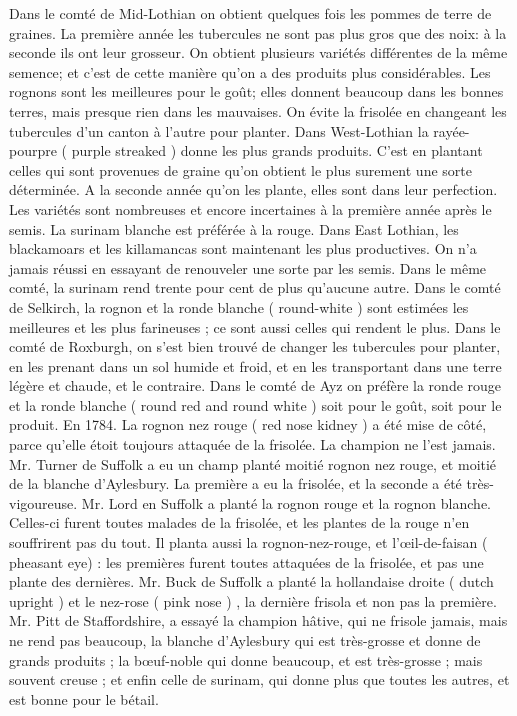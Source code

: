 Dans le comté de Mid-Lothian on obtient quelques fois les pommes de terre de graines. La première année les tubercules ne sont pas plus gros que des noix: à la seconde ils ont leur grosseur. On obtient plusieurs variétés différentes de la même semence; et c'est de cette manière qu'on a des produits plus considérables. Les rognons sont les meilleures pour le goût; elles donnent beaucoup dans les bonnes\setcounter{page}{261} terres, mais presque rien dans les mauvaises. On évite la frisolée en changeant les tubercules d'un canton à l'autre pour planter. Dans West-Lothian la rayée-pourpre ( purple streaked ) donne les plus grands produits. C'est en plantant celles qui sont provenues de graine qu'on obtient le plus surement une sorte déterminée. A la seconde année qu'on les plante, elles sont dans leur perfection. Les variétés sont nombreuses et encore incertaines à la première année après le semis. La surinam blanche est préférée à la rouge. Dans East Lothian, les blackamoars et les killamancas sont maintenant les plus productives. On n'a jamais réussi en essayant de renouveler une sorte par les semis. Dans le même comté, la surinam rend trente pour cent de plus qu'aucune autre. Dans le comté de Selkirch, la rognon et la ronde blanche ( round-white ) sont estimées les meilleures et les plus farineuses ; ce sont aussi celles qui rendent le plus. Dans le comté de Roxburgh, on s'est bien trouvé de changer les tubercules pour planter, en les prenant dans un sol humide et froid, et en les transportant dans une terre légère et chaude, et le contraire. Dans le comté de Ayz on préfère la ronde rouge et la ronde blanche ( round red and\setcounter{page}{262} round white ) soit pour le goût, soit pour le produit.
En 1784. La rognon nez rouge ( red nose kidney ) a été mise de côté, parce qu'elle étoit toujours attaquée de la frisolée. La champion ne l'est jamais.
Mr. Turner de Suffolk a eu un champ planté moitié rognon nez rouge, et moitié de la blanche d'Aylesbury. La première a eu la frisolée, et la seconde a été très-vigoureuse.
Mr. Lord en Suffolk a planté la rognon rouge et la rognon blanche. Celles-ci furent toutes malades de la frisolée, et les plantes de la rouge n'en souffrirent pas du tout. Il planta aussi la rognon-nez-rouge, et l'œil-de-faisan ( pheasant eye) : les premières furent toutes attaquées de la frisolée, et pas une plante des dernières.
Mr. Buck de Suffolk a planté la hollandaise droite ( dutch upright ) et le nez-rose ( pink nose ) , la dernière frisola et non pas la première.
Mr. Pitt de Staffordshire, a essayé la champion hâtive, qui ne frisole jamais, mais ne rend pas beaucoup, la blanche d'Aylesbury qui est très-grosse et donne de grands produits ; la bœuf-noble qui donne beaucoup, et est très-grosse ; mais souvent creuse ; et enfin\setcounter{page}{263} celle de surinam, qui donne plus que toutes les autres, et est bonne pour le bétail.
